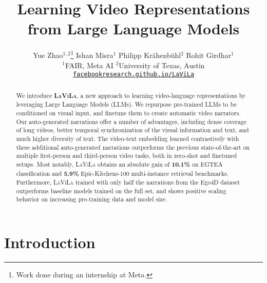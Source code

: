 \documentclass[10pt,twocolumn,letterpaper]{article}
\newcommand{\ours}{\textsc{LaViLa}\xspace}
\begin{document}
\title{Learning Video Representations from Large Language Models}

\author{
	Yue Zhao$^{1,2}$\thanks{Work done during an internship at Meta.} \quad Ishan Misra$^{1}$ \quad Philipp Kr\"ahenb\"uhl$^{2}$ \quad Rohit Girdhar$^{1}$ \\
	$^{1}$FAIR, Meta AI \quad $^{2}$University of Texas, Austin \\
	{\small \href{https://facebookresearch.github.io/LaViLa}{\tt facebookresearch.github.io/LaViLa}}
}


\maketitle

\begin{abstract}
  We introduce {\bf \ours}, a new approach to learning video-language representations by leveraging Large Language Models (LLMs). We repurpose pre-trained LLMs to be conditioned on visual input, and finetune them to create automatic video narrators. Our auto-generated narrations offer a number of advantages, including dense coverage of long videos, better temporal synchronization of the visual information and text, and much higher diversity of text. The video-text embedding learned contrastively with these additional auto-generated narrations outperforms the previous state-of-the-art on multiple first-person and third-person video tasks, both in zero-shot and finetuned setups. Most notably, \ours obtains an absolute gain of {\bf 10.1\%} on EGTEA classification and {\bf 5.9\%} Epic-Kitchens-100 multi-instance retrieval benchmarks. Furthermore, \ours trained with only half the narrations from the Ego4D dataset outperforms baseline models trained on the full set, and shows positive scaling behavior on increasing pre-training data and model size.
\end{abstract} \section{Introduction}
\end{document}
